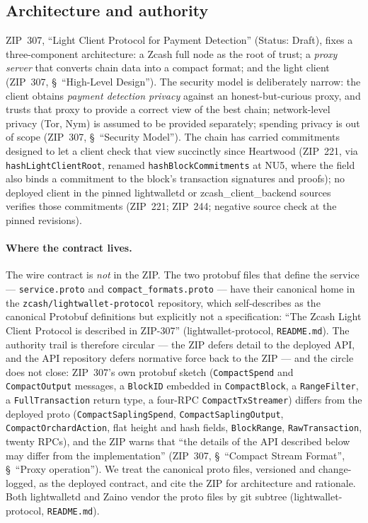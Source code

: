 \documentclass[11pt,a4paper]{article}
\theoremstyle{definition}
\begin{document}
\subsection{Architecture and authority}\label{sec:sync-authority}

ZIP~307, ``Light Client Protocol for Payment Detection'' (Status: Draft),
fixes a three-component architecture: a Zcash full node as the root of
trust; a \emph{proxy server} that converts chain data into a compact
format; and the light client (ZIP~307, \S~``High-Level Design''). The
security model is deliberately narrow: the client obtains \emph{payment
detection privacy} against an honest-but-curious proxy, and trusts that
proxy to provide a correct view of the best chain; network-level privacy
(Tor, Nym) is assumed to be provided separately; spending privacy is out of
scope (ZIP~307, \S~``Security Model''). The chain has carried commitments
designed to let a client check that view succinctly since Heartwood
(ZIP~221, via \texttt{hashLightClientRoot}, renamed
\texttt{hashBlockCommitments} at NU5, where the field also binds a
commitment to the block's transaction signatures and proofs); no
deployed client in the pinned \textsf{lightwalletd} or
\textsf{zcash\_client\_backend} sources verifies those commitments
(ZIP~221; ZIP~244; negative source check at the pinned revisions).

\paragraph{Where the contract lives.} The wire contract is \emph{not} in
the ZIP. The two protobuf files that define the service ---
\texttt{service.proto} and \texttt{compact\_formats.proto} --- have their
canonical home in the \texttt{zcash/lightwallet-protocol} repository, which
self-describes as the canonical Protobuf definitions but explicitly not a
specification: ``The Zcash Light Client Protocol is described in ZIP-307''
(\textsf{lightwallet-protocol}, \texttt{README.md}). The authority trail is
therefore circular --- the ZIP defers detail to the deployed API, and the
API repository defers normative force back to the ZIP --- and the circle
does not close: ZIP~307's own protobuf sketch (\texttt{CompactSpend} and
\texttt{CompactOutput} messages, a \texttt{BlockID} embedded in
\texttt{CompactBlock}, a \texttt{RangeFilter}, a \texttt{FullTransaction}
return type, a four-RPC \texttt{CompactTxStreamer}) differs from the
deployed proto (\texttt{CompactSaplingSpend}, \texttt{CompactSaplingOutput},
\texttt{CompactOrchardAction}, flat height and hash fields,
\texttt{BlockRange}, \texttt{RawTransaction}, twenty RPCs), and the ZIP
warns that ``the details of the API described below may differ from the
implementation'' (ZIP~307, \S~``Compact Stream Format'', \S~``Proxy
operation''). We treat the canonical proto files, versioned and
change-logged, as the deployed contract, and cite the ZIP for architecture
and rationale. Both lightwalletd and Zaino vendor the proto files by git
subtree (\textsf{lightwallet-protocol}, \texttt{README.md}).
\end{document}
